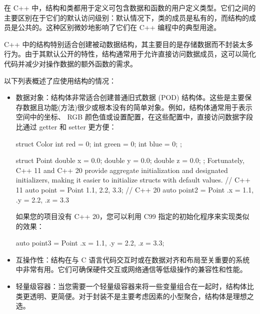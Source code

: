 
在 C++ 中，结构和类都用于定义可包含数据和函数的用户定义类型。它们之间的主要区别在于它们的默认访问级别：默认情况下，类的成员是私有的，而结构的成员是公共的。这种区别微妙地影响了它们在 C++ 编程中的典型用途。


C++ 中的结构特别适合创建被动数据结构，其主要目的是存储数据而不封装太多行为。由于其默认公开的特性，结构通常用于允许直接访问数据成员，这可以简化代码并减少对操作数据的额外函数的需求。

以下列表概述了应使用结构的情况：

\begin{itemize}
\item
数据对象：结构体非常适合创建普通旧式数据 (POD) 结构体。这些是主要保存数据且功能(方法)很少或根本没有的简单对象。例如，结构体通常用于表示空间中的坐标、 RGB 颜色值或设置配置，在这些配置中，直接访问数据字段比通过 getter 和 setter 更方便：

\begin{cpp}
struct Color {
    int red = 0;
    int green = 0;
    int blue = 0;
};

struct Point {
    double x = 0.0;
    double y = 0.0;
    double z = 0.0;
};
Fortunately, C++ 11 and C++ 20 provide aggregate initialization
and designated initializers, making it easier to initialize
structs with default values.
// C++ 11
    auto point = Point {1.1, 2.2, 3.3};
// C++ 20
    auto point2 = Point {.x = 1.1, .y = 2.2, .z = 3.3}
\end{cpp}

如果您的项目没有 C++ 20，您可以利用 C99 指定的初始化程序来实现类似的效果：

\begin{cpp}
    auto point3 = Point {.x = 1.1, .y = 2.2, .z = 3.3};
\end{cpp}

\item
互操作性：结构在与 C 语言代码交互时或在数据对齐和布局至关重要的系统中非常有用。它们可确保硬件交互或网络通信等低级操作的兼容性和性能。

\item
轻量级容器：当您需要一个轻量级容器来将一些变量组合在一起时，结构体比类更透明、更简便。对于封装不是主要考虑因素的小型聚合，结构体是理想之选。
\end{itemize}


